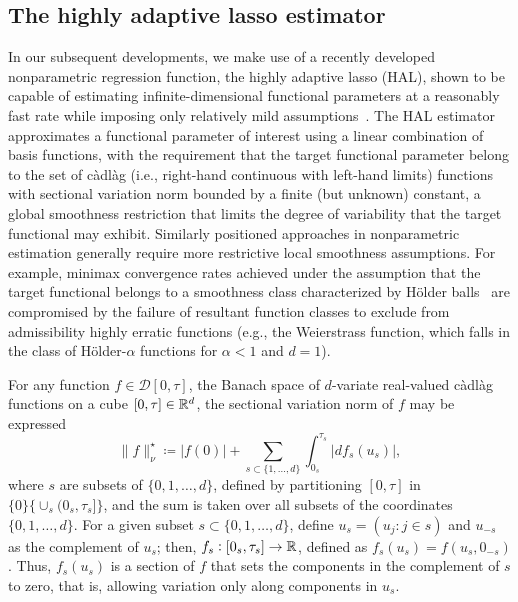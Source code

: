 \subsection{The highly adaptive lasso estimator}\label{hal}

In our subsequent developments, we make use of a recently developed
nonparametric regression function, the highly adaptive lasso (HAL), shown to be
capable of estimating infinite-dimensional functional parameters at a reasonably
fast rate while imposing only relatively mild
assumptions~\citep{vdl2017generally, vdl2017uniform}. The HAL estimator
approximates a functional parameter of interest using a linear combination of
basis functions, with the requirement that the target functional parameter
belong to the set of c\`{a}dl\`{a}g (i.e., right-hand continuous with left-hand
limits) functions with sectional variation norm bounded by a finite (but
unknown) constant, a global smoothness restriction that limits the degree of
variability that the target functional may exhibit. Similarly positioned
approaches in nonparametric estimation generally require more restrictive local
smoothness assumptions. For example, minimax convergence rates achieved under
the assumption that the target functional belongs to a smoothness class
characterized by H{\"o}lder balls~\citep[e.g.,][]{robins2008higher,
robins2017minimax} are compromised by the failure of resultant function classes
to exclude from admissibility highly erratic functions (e.g., the Weierstrass
function, which falls in the class of H{\"o}lder-$\alpha$ functions for $\alpha
< 1$ and $d = 1$).

For any function $f \in \mathcal{D}[0,\tau]$, the Banach space of $d$-variate
real-valued c\`{a}dl\`{a}g functions on a cube $[0,\tau] \in \mathbb{R}^d$, the
sectional variation norm of $f$ may be expressed
\begin{equation*}
  \lVert f \rVert^{\star}_\nu \coloneqq \lvert f(0) \rvert + \sum_{s
  \subset\{1, \ldots, d\}} \int_{0_s}^{\tau_s} \lvert df_s(u_s) \rvert,
\end{equation*}
where $s$ are subsets of $\{0, 1, \ldots, d\}$, defined by partitioning
$[0,\tau]$ in $\{0\} \{ \cup_s (0_s,\tau_s]\}$, and the sum is taken over all
subsets of the coordinates $\{0,1,\ldots,d\}$. For a given subset $s \subset
\{0,1,\ldots,d\}$, define $u_s = (u_j : j \in s)$ and $u_{-s}$ as the complement
of $u_s$; then, $f_s: [0_s, \tau_s] \rightarrow \mathbb{R}$, defined as $f_s(u_s)
= f(u_s,0_{-s})$. Thus, $f_s(u_s)$ is a section of $f$ that sets the components
in the complement of $s$ to zero, that is, allowing variation only along
components in $u_s$.

